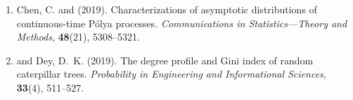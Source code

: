 \begin{enumerate}[resume=journalpubs]

\item\begin{pubentry} Chen, C. and \PZ{} (2019). Characterizations of asymptotic distributions of continuous-time P\'{o}lya processes. \emph{Communications in Statistics---Theory and Methods}, \textbf{48}(21), 5308--5321.

\par\end{pubentry}
\item\begin{pubentry} \PZ{} and Dey, D.\ K. (2019). The degree profile and Gini index of random caterpillar trees. \emph{Probability in Engineering and Informational Sciences}, \textbf{33}(4), 511--527.
\par\end{pubentry}
\end{enumerate}

